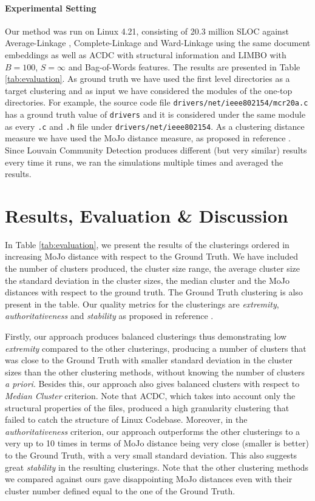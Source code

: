 \documentclass[sigconf,review, anonymous]{acmart}
\begin{document}
\paragraph{Experimental Setting} Our method was run on Linux 4.21,
consisting of 20.3 million SLOC against Average-Linkage \cite{average}, Complete-Linkage \cite{complete} 
and Ward-Linkage \cite{ward} using the same document embeddings
as well as ACDC with structural information \cite{acdc} and LIMBO \cite{limbo} with $B = 100$, $S = \infty$ and Bag-of-Words features. The results are presented in Table \ref{tab:evaluation}. 
As ground truth we have used the first level directories as a target clustering and as input we have considered 
the modules of the one-top directories. 
For example, the source code file \texttt{drivers/net/ieee802154\-/mcr20a.c} has a ground truth value of \texttt{drivers} 
and it is considered under the same module as every \texttt{.c} and \texttt{.h} file under \texttt{drivers/net/ieee802154}. 
As a clustering distance measure we have used the MoJo distance measure, as proposed in reference \cite{mojo}. 
Since Louvain Community Detection produces  different (but very similar) results every time it runs, we ran the simulations 
multiple times and averaged the results. 

\section{Results, Evaluation \& Discussion}

In Table \ref{tab:evaluation}, we present the results of the clusterings ordered in increasing MoJo distance 
with respect to the Ground Truth. 
We have included the number of clusters produced, the cluster size range, the average cluster size the standard
deviation in the cluster sizes, the median cluster and the MoJo distances with respect to the ground truth. 
The Ground Truth clustering is also present in the table. 
Our quality metrics for the clusterings are 
\emph{extremity}, \emph{authoritativeness} and \emph{stability} as proposed in reference \cite{evaluation}.

Firstly, our approach produces balanced clusterings thus demonstrating low \emph{extremity} compared to the other clusterings, 
producing a number of clusters that was close to the Ground Truth with smaller standard deviation in the cluster sizes than 
the other clustering methods, without knowing the number of clusters \emph{a priori}. 
Besides this, our approach also gives balanced clusters with respect to \emph{Median Cluster} criterion. 
Note that ACDC, which takes into account only the structural properties of the files, produced a high 
granularity clustering that failed to catch the structure of Linux Codebase. 
Moreover, in the \emph{authoritativeness} criterion, our approach outperforms the other clusterings to a very up to 10 times 
in terms of MoJo distance being very close (smaller is better) to the Ground Truth, with a very small standard deviation. 
This also suggests great \emph{stability} in the resulting clusterings. 
Note that the other clustering methods we compared against ours gave disappointing MoJo distances even with their cluster
number defined equal to the one of the Ground Truth. 
\end{document}
